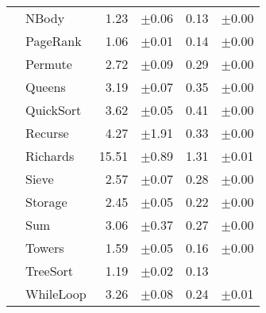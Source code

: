 \begin{tabular}{ll@{\hspace{6pt}}r@{\hspace{3pt}}l@{\hspace{6pt}}r@{\hspace{3pt}}l}
 & NBody & 1.23 & \scriptsize\textcolor{gray!60}{$\pm$0.06} & 0.13 & \scriptsize\textcolor{gray!60}{$\pm$0.00} \\
 & PageRank & 1.06 & \scriptsize\textcolor{gray!60}{$\pm$0.01} & 0.14 & \scriptsize\textcolor{gray!60}{$\pm$0.00} \\
 & Permute & 2.72 & \scriptsize\textcolor{gray!60}{$\pm$0.09} & 0.29 & \scriptsize\textcolor{gray!60}{$\pm$0.00} \\
 & Queens & 3.19 & \scriptsize\textcolor{gray!60}{$\pm$0.07} & 0.35 & \scriptsize\textcolor{gray!60}{$\pm$0.00} \\
 & QuickSort & 3.62 & \scriptsize\textcolor{gray!60}{$\pm$0.05} & 0.41 & \scriptsize\textcolor{gray!60}{$\pm$0.00} \\
 & Recurse & 4.27 & \scriptsize\textcolor{gray!60}{$\pm$1.91} & 0.33 & \scriptsize\textcolor{gray!60}{$\pm$0.00} \\
 & Richards & 15.51 & \scriptsize\textcolor{gray!60}{$\pm$0.89} & 1.31 & \scriptsize\textcolor{gray!60}{$\pm$0.01} \\
 & Sieve & 2.57 & \scriptsize\textcolor{gray!60}{$\pm$0.07} & 0.28 & \scriptsize\textcolor{gray!60}{$\pm$0.00} \\
 & Storage & 2.45 & \scriptsize\textcolor{gray!60}{$\pm$0.05} & 0.22 & \scriptsize\textcolor{gray!60}{$\pm$0.00} \\
 & Sum & 3.06 & \scriptsize\textcolor{gray!60}{$\pm$0.37} & 0.27 & \scriptsize\textcolor{gray!60}{$\pm$0.00} \\
 & Towers & 1.59 & \scriptsize\textcolor{gray!60}{$\pm$0.05} & 0.16 & \scriptsize\textcolor{gray!60}{$\pm$0.00} \\
 & TreeSort & 1.19 & \scriptsize\textcolor{gray!60}{$\pm$0.02} & 0.13 &  \\
 & WhileLoop & 3.26 & \scriptsize\textcolor{gray!60}{$\pm$0.08} & 0.24 & \scriptsize\textcolor{gray!60}{$\pm$0.01} \\
\bottomrule
\end{tabular}